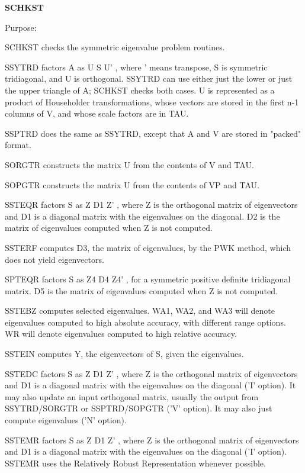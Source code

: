 {\bfseries S\+C\+H\+K\+S\+T} 

\begin{DoxyParagraph}{Purpose\+: }
\begin{DoxyVerb} SCHKST  checks the symmetric eigenvalue problem routines.

    SSYTRD factors A as  U S U' , where ' means transpose,
    S is symmetric tridiagonal, and U is orthogonal.
    SSYTRD can use either just the lower or just the upper triangle
    of A; SCHKST checks both cases.
    U is represented as a product of Householder
    transformations, whose vectors are stored in the first
    n-1 columns of V, and whose scale factors are in TAU.

    SSPTRD does the same as SSYTRD, except that A and V are stored
    in "packed" format.

    SORGTR constructs the matrix U from the contents of V and TAU.

    SOPGTR constructs the matrix U from the contents of VP and TAU.

    SSTEQR factors S as  Z D1 Z' , where Z is the orthogonal
    matrix of eigenvectors and D1 is a diagonal matrix with
    the eigenvalues on the diagonal.  D2 is the matrix of
    eigenvalues computed when Z is not computed.

    SSTERF computes D3, the matrix of eigenvalues, by the
    PWK method, which does not yield eigenvectors.

    SPTEQR factors S as  Z4 D4 Z4' , for a
    symmetric positive definite tridiagonal matrix.
    D5 is the matrix of eigenvalues computed when Z is not
    computed.

    SSTEBZ computes selected eigenvalues.  WA1, WA2, and
    WA3 will denote eigenvalues computed to high
    absolute accuracy, with different range options.
    WR will denote eigenvalues computed to high relative
    accuracy.

    SSTEIN computes Y, the eigenvectors of S, given the
    eigenvalues.

    SSTEDC factors S as Z D1 Z' , where Z is the orthogonal
    matrix of eigenvectors and D1 is a diagonal matrix with
    the eigenvalues on the diagonal ('I' option). It may also
    update an input orthogonal matrix, usually the output
    from SSYTRD/SORGTR or SSPTRD/SOPGTR ('V' option). It may
    also just compute eigenvalues ('N' option).

    SSTEMR factors S as Z D1 Z' , where Z is the orthogonal
    matrix of eigenvectors and D1 is a diagonal matrix with
    the eigenvalues on the diagonal ('I' option).  SSTEMR
    uses the Relatively Robust Representation whenever possible.


\end{DoxyVerb}
\end{DoxyParagraph}
